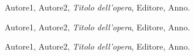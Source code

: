 \begin{thebibliography}{99}

 Autore1, Autore2,
{\em Titolo dell'opera},
Editore, Anno.

 Autore1, Autore2,
{\em Titolo dell'opera},
Editore, Anno.

 Autore1, Autore2,
{\em Titolo dell'opera},
Editore, Anno.

\end{thebibliography}